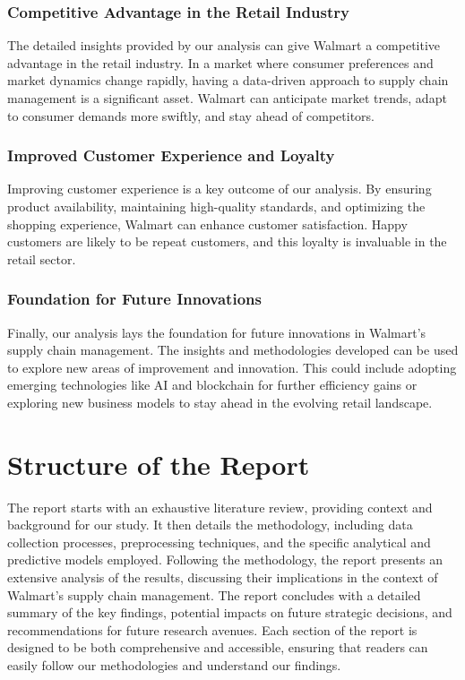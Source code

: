 \documentclass[conference]{IEEEtran}
\begin{document}
\subsubsection{Competitive Advantage in the Retail Industry}
The detailed insights provided by our analysis can give Walmart a competitive advantage in the retail industry. In a market where consumer preferences and market dynamics change rapidly, having a data-driven approach to supply chain management is a significant asset. Walmart can anticipate market trends, adapt to consumer demands more swiftly, and stay ahead of competitors.

\subsubsection{Improved Customer Experience and Loyalty}
Improving customer experience is a key outcome of our analysis. By ensuring product availability, maintaining high-quality standards, and optimizing the shopping experience, Walmart can enhance customer satisfaction. Happy customers are likely to be repeat customers, and this loyalty is invaluable in the retail sector.

\subsubsection{Foundation for Future Innovations}
Finally, our analysis lays the foundation for future innovations in Walmart’s supply chain management. The insights and methodologies developed can be used to explore new areas of improvement and innovation. This could include adopting emerging technologies like AI and blockchain for further efficiency gains or exploring new business models to stay ahead in the evolving retail landscape.

\section{Structure of the Report}
The report starts with an exhaustive literature review, providing context and background for our study. It then details the methodology, including data collection processes, preprocessing techniques, and the specific analytical and predictive models employed. Following the methodology, the report presents an extensive analysis of the results, discussing their implications in the context of Walmart’s supply chain management. The report concludes with a detailed summary of the key findings, potential impacts on future strategic decisions, and recommendations for future research avenues. Each section of the report is designed to be both comprehensive and accessible, ensuring that readers can easily follow our methodologies and understand our findings.
\end{document}
